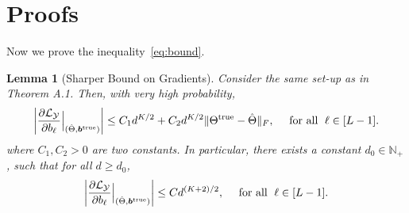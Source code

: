 \documentclass[11pt]{article}
\theoremstyle{plain}
\newtheorem{lem}{Lemma}
\theoremstyle{definition}
\begin{document}
\section{Proofs}
Now we prove the inequality~\eqref{eq:bound}. 
\begin{lem}[Sharper Bound on Gradients]\label{lem:gradient}
Consider the same set-up as in Theorem A.1. Then, with very high probability,
\[
\left|{\partial \mathcal{L}_{\mathcal{Y}}\over \partial b_\ell}\Big|_{(\hat \Theta, \bm{b}^{\mathrm{true}})}\right| \leq C_1d^{K/2}+C_2d^{K/2}\lVert\Theta^{\mathrm{true}}-\hat \Theta\rVert_F,\quad \textrm{ for all } \; \ell\in [L-1].
\]
where $C_1,C_2>0$ are two constants. In particular, there exists a constant $d_0\in\mathbb{N}_{+}$, such that for all $d\geq d_0$,
\begin{equation}
\left|{\partial \mathcal{L}_{\mathcal{Y}}\over \partial b_\ell}\Big|_{(\hat \Theta, \bm{b}^{\mathrm{true}})}\right|   \leq Cd^{(K+2)/2},\quad \textrm{ for all } \; \ell\in [L-1].
\end{equation}
\end{lem}
\end{document}
